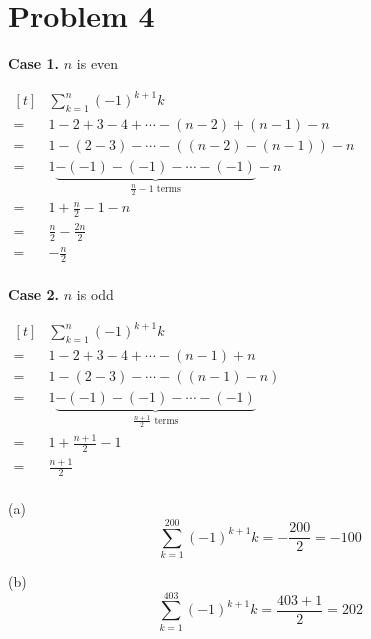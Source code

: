 \documentclass{article}
\begin{document}
\section*{Problem 4}
\centering
\begin{minipage}[t]{0.55\linewidth}
	\textbf{Case 1.} $n$ is even

	$\begin{aligned}[t]
		&\sum_{k=1}^{n}(-1)^{k+1}k \\
		=\,&1-2+3-4+\cdots-(n-2)+(n-1)-n \\
		=\,&1-(2-3)-\cdots-((n-2)-(n-1))-n \\
		=\,&1\underbrace{-(-1)-(-1)-\cdots-(-1)}_
			{\frac{n}{2}-1\text{ terms}}-n \\
		=\,&1+\frac{n}{2}-1-n \\
		=\,&\frac{n}{2}-\frac{2n}{2} \\
		=\,&-\frac{n}{2} \\
	\end{aligned}$
\end{minipage}
\begin{minipage}[t]{0.4\linewidth}
	\textbf{Case 2.} $n$ is odd

	$\begin{aligned}[t]
		&\sum_{k=1}^{n}(-1)^{k+1}k \\
		=\,&1-2+3-4+\cdots-(n-1)+n \\
		=\,&1-(2-3)-\cdots-((n-1)-n) \\
		=\,&1\underbrace{-(-1)-(-1)-\cdots-(-1)}_
			{\frac{n+1}{2}\text{ terms}} \\
		=\,&1+\frac{n+1}{2}-1 \\
		=\,&\frac{n+1}{2} \\
	\end{aligned}$
\end{minipage}

\begin{itemize}
\centering
\begin{minipage}[t]{0.49\linewidth}
\item[(a)]
	\begin{equation*}
		\sum_{k=1}^{200}(-1)^{k+1}k=-\frac{200}{2}=\boxed{-100}
	\end{equation*}
\end{minipage}
\begin{minipage}[t]{0.49\linewidth}
\item[(b)]
	\begin{equation*}
		\sum_{k=1}^{403}(-1)^{k+1}k=\frac{403+1}{2}=\boxed{202}
	\end{equation*}
\end{minipage}
\flushleft
\end{itemize}
\flushleft
\end{document}
